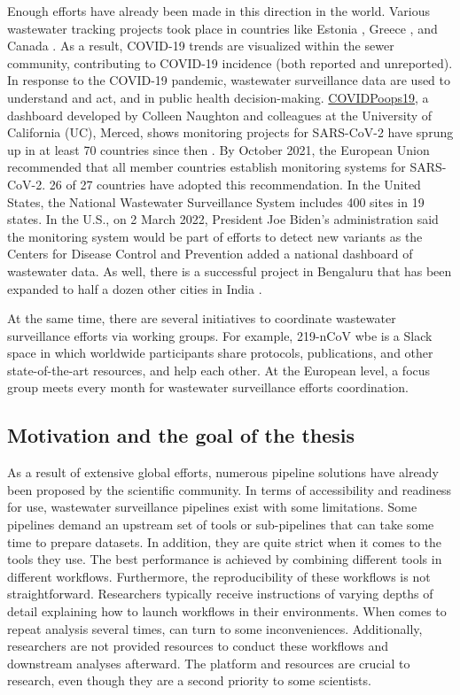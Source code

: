         Enough efforts have already been made in this direction in the world. Various wastewater tracking projects took place in countries like Estonia \cite{detecting2022,reoveeseire}, Greece \cite{ismart}, and Canada \cite{coalition}. As a result, COVID-19 trends are visualized within the sewer community, contributing to COVID-19 incidence (both reported and unreported). In response to the COVID-19 pandemic, wastewater surveillance data are used to understand and act, and in public health decision-making. \href{https://www.arcgis.com/apps/dashboards/c778145ea5bb4daeb58d31afee389082}{COVIDPoops19}, a dashboard developed by Colleen Naughton and colleagues at the University of California (UC), Merced, shows monitoring projects for SARS-CoV-2 have sprung up in at least 70 countries since then \cite{naughton2021}. By October 2021, the European Union recommended that all member countries establish monitoring systems for SARS-CoV-2. 26 of 27 countries have adopted this recommendation. In the United States, the National Wastewater Surveillance System includes 400 sites in 19 states. In the U.S., on 2 March 2022, President Joe Biden's administration said the monitoring system would be part of efforts to detect new variants as the Centers for Disease Control and Prevention added a national dashboard of wastewater data. As well, there is a successful project in Bengaluru that has been expanded to half a dozen other cities in India \cite{pandemic2022}. 
        
        At the same time, there are several initiatives to coordinate wastewater surveillance efforts via working groups. For example, 219-nCoV \acrshort{wbe} is a Slack space in which worldwide participants share protocols, publications, and other state-of-the-art resources, and help each other. At the European level, a focus group meets every month for wastewater surveillance efforts coordination.
        
    \subsection{Motivation and the goal of the thesis}
    As a result of extensive global efforts, numerous pipeline solutions have already been proposed by the scientific community. In terms of accessibility and readiness for use, wastewater surveillance pipelines exist with some limitations. Some pipelines demand an upstream set of tools or sub-pipelines that can take some time to prepare datasets. In addition, they are quite strict when it comes to the tools they use. The best performance is achieved by combining different tools in different workflows. Furthermore, the reproducibility of these workflows is not straightforward. Researchers typically receive instructions of varying depths of detail explaining how to launch workflows in their environments. When comes to repeat analysis several times, can turn to some inconveniences. Additionally, researchers are not provided resources to conduct these workflows and downstream analyses afterward. The platform and resources are crucial to research, even though they are a second priority to some scientists.

